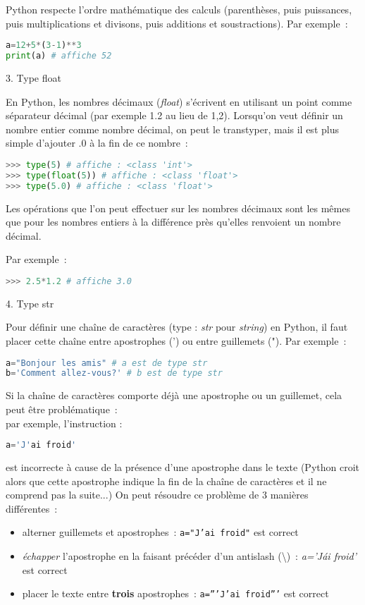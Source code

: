 Python respecte l'ordre mathématique des calculs (parenthèses, puis puissances, puis multiplications et divisons, puis additions et soustractions). Par exemple~:
 \begin{lstlisting}[language=Python]
a=12+5*(3-1)**3 
print(a) # affiche 52
\end{lstlisting}
\begin{h2}3. Type \og float \fg{} \end{h2}
En Python, les nombres décimaux (\textit{float}) s'écrivent en utilisant un point comme séparateur décimal (par exemple 1.2 au lieu de 1,2).
Lorsqu'on veut définir un nombre entier comme nombre décimal, on peut le transtyper, mais il est plus simple d'ajouter \og .0 \fg{} à la fin de ce nombre~:
\begin{lstlisting}[language=Python]
>>> type(5) # affiche : <class 'int'>
>>> type(float(5)) # affiche : <class 'float'>
>>> type(5.0) # affiche : <class 'float'>
\end{lstlisting}
Les opérations que l'on peut effectuer sur les nombres décimaux sont les mêmes que pour les nombres entiers à la différence près qu'elles renvoient un nombre décimal.
\par
Par exemple~:
\begin{lstlisting}[language=Python]
>>> 2.5*1.2 # affiche 3.0
\end{lstlisting}
\begin{h2}4. Type \og str \fg{} \end{h2}
Pour définir une chaîne de caractères (type : \textit{str} pour \textit{string}) en Python, il faut placer cette chaîne entre apostrophes (') ou entre guillemets ("). Par exemple~:
 \begin{lstlisting}[language=Python]
a="Bonjour les amis" # a est de type str
b='Comment allez-vous?' # b est de type str
\end{lstlisting}
Si la chaîne de caractères comporte déjà une apostrophe ou un guillemet, cela peut être problématique~:\\
par exemple, l'instruction :
 \begin{lstlisting}[language=Python]
a='J'ai froid'
\end{lstlisting}
est incorrecte à cause de la présence d'une apostrophe dans le texte (Python croit alors que cette apostrophe indique la fin de la chaîne de caractères et il ne comprend pas la suite...)
On peut résoudre ce problème de 3 manières différentes~:
\begin{itemize}
     \item %
     alterner guillemets et apostrophes~: \texttt{a="J'ai froid"} est correct
     \item %
     \textit{échapper} l'apostrophe en la faisant précéder d'un antislash (\textbackslash)~: \textit{a='J\'ai froid'} est correct
     \item %
     placer le texte entre \textbf{trois} apostrophes~: \texttt{a='''J'ai froid'''} est correct
\end{itemize}
